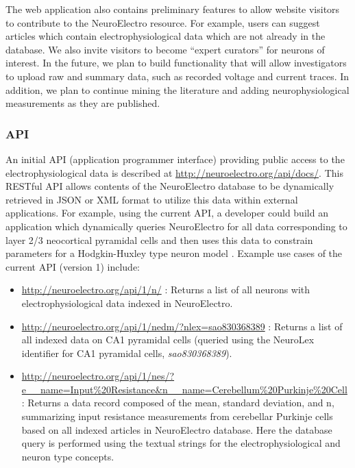 \documentclass{template/frontiersSCNS} %
\begin{document}
The web application also contains preliminary features to allow website visitors to contribute to the NeuroElectro resource.  
For example, users can suggest articles which contain electrophysiological data which are not already in the database.  
We also invite visitors to become ``expert curators'' for neurons of interest.  
In the future, we plan to build functionality that will allow investigators to upload raw and summary data, such as recorded voltage and current traces.  
In addition, we plan to continue mining the literature and adding neurophysiological measurements as they are published.

\subsubsection{API}
An initial API (application programmer interface) providing public access to the electrophysiological data is described at \url{http://neuroelectro.org/api/docs/}.  
This RESTful API allows contents of the NeuroElectro database to be dynamically retrieved in JSON or XML format to utilize this data within external applications.  
For example, using the current API, a developer could build an application which dynamically queries NeuroElectro for all data corresponding to layer 2/3 neocortical pyramidal cells and then uses this data to constrain parameters for a Hodgkin-Huxley type neuron model \citep{hodgkin_quantitative_1952}.  
Example use cases of the current API (version 1) include:

\begin{itemize}
\item \url{http://neuroelectro.org/api/1/n/} : Returns a list of all neurons with electrophysiological data indexed in NeuroElectro.
\item \url{http://neuroelectro.org/api/1/nedm/?nlex=sao830368389} : Returns a list of all indexed data on CA1 pyramidal cells (queried using the NeuroLex identifier for CA1 pyramidal cells, \emph{sao830368389}).  
\item \url{http://neuroelectro.org/api/1/nes/?e\_\_name=Input\%20Resistance\&n\_\_name=Cerebellum\%20Purkinje\%20Cell} : Returns a data record composed of the mean, standard deviation, and n, summarizing input resistance measurements from cerebellar Purkinje cells based on all indexed articles in NeuroElectro database.  
Here the database query is performed using the textual strings for the electrophysiological and neuron type concepts.
\end{itemize}
\end{document}
